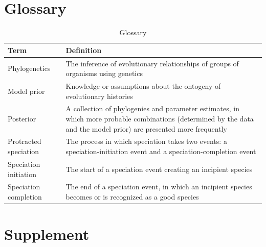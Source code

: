\section{Glossary}
\begin{table}
  \centering 
  \begin{tabular}{l p{}}
    \hline
    Term                  & Definition \\
    \hline
    \hline
    Phylogenetics         & The inference of evolutionary relationships of groups of organisms using genetics \\
    Model prior           & Knowledge or assumptions about the ontogeny of evolutionary histories \\
    Posterior             & A collection of phylogenies and parameter estimates, in which more probable combinations (determined by the data and the model prior) are presented more frequently \\
    Protracted speciation & The process in which speciation takes two events: a speciation-initiation event and a speciation-completion event  \\
    Speciation initiation & The start of a speciation event creating an incipient species \\
    Speciation completion & The end of a speciation event, in which an incipient species becomes or is recognized as a good species \\
    \hline
  \end{tabular}
  \caption{
    Glossary
  }
  \label{table:glossary}
\end{table}




\section{Supplement}

